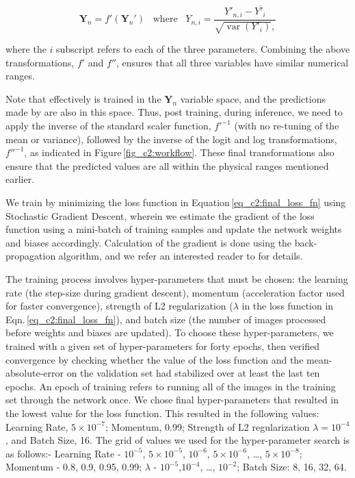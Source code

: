 \begin{equation}
\boldsymbol{Y}_n = f'(\boldsymbol{Y}_n')\,\,\,\,\,\mathrm{where}\,\,\,\,\,{Y}_{n,i} = \frac{Y'_{n,i} - \overline{Y'_{i}}}{\sqrt{\operatorname{var}(Y'_{i})} ,} 
\label{eq_c2:transformation_f'}
\end{equation}

\noindent
where the $i$ subscript refers to each of the three parameters. Combining the above transformations, $f'$ and $f''$, ensures that all three variables have similar numerical ranges.  

Note that effectively \gampen{} is trained in the $\boldsymbol{Y}_n$ variable space, and the predictions made by \gampen{} are also in this space. Thus, post training, during inference, we need to apply the inverse of the standard scaler function, $f'^{-1}$ (with no re-tuning of the mean or variance), followed by the inverse of the logit and log transformations, $f''^{-1}$, as indicated in Figure\,\ref{fig_c2:workflow}. These final transformations also ensure that the predicted values are all within the physical ranges mentioned earlier.

We train \gampen{} by minimizing the loss function in Equation\,\ref{eq_c2:final_loss_fn} using Stochastic Gradient Descent, wherein we estimate the gradient of the loss function using a mini-batch of training samples and update the network weights and biases accordingly. Calculation of the gradient is done using the back-propagation algorithm, and we refer an interested reader to \citet{rumelhart_88} for details.

The training process involves hyper-parameters that must be chosen: the learning rate (the step-size during gradient descent), momentum (acceleration factor used for faster convergence), strength of L2 regularization ($\lambda$ in the loss function in Eqn.\,\ref{eq_c2:final_loss_fn}), and batch size (the number of images processed before weights and biases are updated).
To choose these hyper-parameters, we trained \gampen{} with a given set of hyper-parameters for forty epochs, then verified convergence by checking whether the value of the loss function and the mean-absolute-error on the validation set had stabilized over at least the last ten epochs. An epoch of training refers to running all of the images in the training set through the network once. We chose final hyper-parameters that resulted in the lowest value for the loss function. This resulted in the following values: Learning Rate, $5\times10^{-7}$; Momentum, 0.99; Strength of L2 regularization $\lambda=10^{-4}$, and Batch Size, 16. The grid of values we used for the hyper-parameter search is as follows:- Learning Rate - $10^{-5}$, $5 \times 10^{-5}$, $10^{-6}$, $5 \times 10^{-6}$, \ldots,  $5 \times 10^{-8}$; Momentum - 0.8, 0.9, 0.95, 0.99; $\lambda$ - $10^{-5}$,$10^{-4}$, \ldots, $10^{-2}$; Batch Size: 8, 16, 32, 64.

